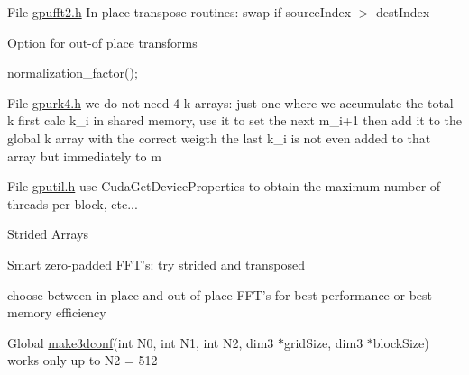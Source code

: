 \label{todo__todo000013}
\hypertarget{todo__todo000013}{}
 
\begin{DoxyDescription}
\item[File \hyperlink{gpufft2_8h}{gpufft2.h} ]In place transpose routines: swap if sourceIndex $>$ destIndex 

Option for out-\/of place transforms 

normalization\_\-factor();


\end{DoxyDescription}

\label{todo__todo000015}
\hypertarget{todo__todo000015}{}
 
\begin{DoxyDescription}
\item[File \hyperlink{gpurk4_8h}{gpurk4.h} ]we do not need 4 k arrays: just one where we accumulate the total k first calc k\_\-i in shared memory, use it to set the next m\_\-i+1 then add it to the global k array with the correct weigth the last k\_\-i is not even added to that array but immediately to m


\end{DoxyDescription}

\label{todo__todo000016}
\hypertarget{todo__todo000016}{}
 
\begin{DoxyDescription}
\item[File \hyperlink{gputil_8h}{gputil.h} ]use CudaGetDeviceProperties to obtain the maximum number of threads per block, etc... 

Strided Arrays 

Smart zero-\/padded FFT's: try strided and transposed 

choose between in-\/place and out-\/of-\/place FFT's for best performance or best memory efficiency


\end{DoxyDescription}

\label{todo__todo000019}
\hypertarget{todo__todo000019}{}
 
\begin{DoxyDescription}
\item[Global \hyperlink{gputil_8h_a5f10ebe67635ce652fa229fa9d8ebc78}{make3dconf}(int N0, int N1, int N2, dim3 $\ast$gridSize, dim3 $\ast$blockSize) ]works only up to N2 = 512 
\end{DoxyDescription}

\label{todo__todo000010}
\hypertarget{todo__todo000010}{}
 
